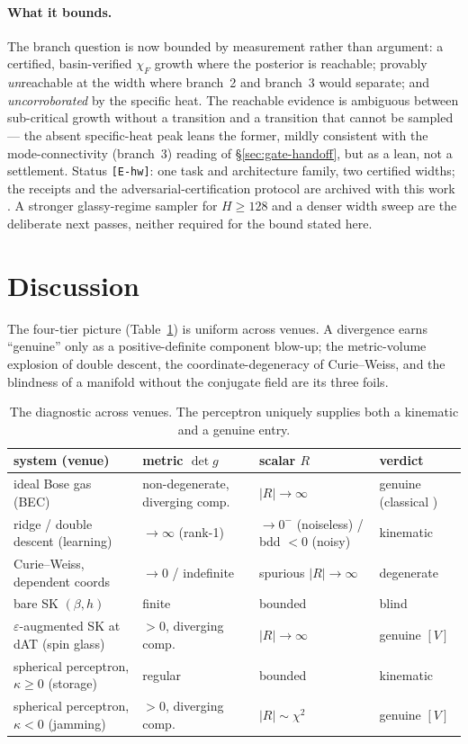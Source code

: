 \documentclass[a4paper,11pt]{article}
\theoremstyle{plain}
\theoremstyle{definition}
\theoremstyle{remark}
\newcommand{\Ric}{R}
\newcommand{\eps}{\varepsilon}
\newcommand{\detg}{\det g}
\begin{document}
\paragraph{What it bounds.} The branch question is now bounded by measurement rather than argument: a
certified, basin-verified $\chi_F$ growth where the posterior is reachable; provably \emph{un}reachable at the
width where branch~2 and branch~3 would separate; and \emph{uncorroborated} by the specific heat. The
reachable evidence is ambiguous between sub-critical growth without a transition and a transition that cannot
be sampled --- the absent specific-heat peak leans the former, mildly consistent with the mode-connectivity
(branch~3) reading of \S\ref{sec:gate-handoff}, but as a lean, not a settlement. Status \texttt{[E-hw]}: one
task and architecture family, two certified widths; the receipts and the adversarial-certification protocol
are archived with this work \cite{repo}. A stronger glassy-regime sampler for $H\ge128$ and a denser width
sweep are the deliberate next passes, neither required for the bound stated here.

\section{Discussion}\label{sec:discussion}
The four-tier picture (Table~\ref{tab:tax}) is uniform across venues. A divergence earns ``genuine'' only as
a positive-definite component blow-up; the metric-volume explosion of double descent, the
coordinate-degeneracy of Curie--Weiss, and the blindness of a manifold without the conjugate field are its
three foils.

\begin{table}[h]\centering
\begin{tabular}{@{}llll@{}}
\toprule
system (venue) & metric $\detg$ & scalar $\Ric$ & verdict\\
\midrule
ideal Bose gas (BEC) & non-degenerate, diverging comp. & $|\Ric|\to\infty$ & genuine (classical \cite{janyszek1990})\\
ridge / double descent (learning) & $\to\infty$ (rank-1) & $\to0^-$ (noiseless) / bdd $<0$ (noisy) & kinematic\\
Curie--Weiss, dependent coords & $\to0$ / indefinite & spurious $|\Ric|\to\infty$ & degenerate\\
bare SK $(\beta,h)$ & finite & bounded & blind\\
$\eps$-augmented SK at dAT (spin glass) & $>0$, diverging comp. & $|\Ric|\to\infty$ & genuine $[V]$\\
spherical perceptron, $\kappa\ge0$ (storage) & regular & bounded & kinematic\\
spherical perceptron, $\kappa<0$ (jamming) & $>0$, diverging comp. & $|\Ric|\sim\chi^2$ & genuine $[V]$\\
\bottomrule
\end{tabular}
\caption{The diagnostic across venues. The perceptron uniquely supplies both a kinematic and a genuine
entry.}\label{tab:tax}
\end{table}
\end{document}
